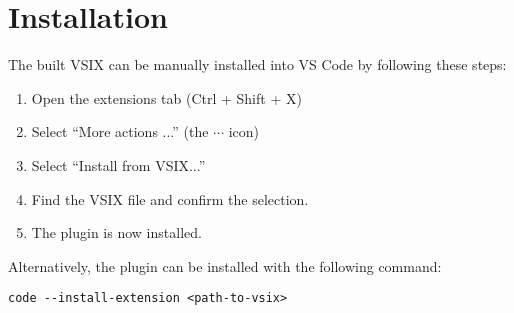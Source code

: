 \section{Installation}
The built VSIX can be manually installed into VS Code by following these steps:
\begin{enumerate}
	\item Open the extensions tab (Ctrl + Shift + X)
	\item Select ``More actions ...'' (the $\cdots$ icon)
	\item Select ``Install from VSIX...''
	\item Find the VSIX file and confirm the selection.
	\item The plugin is now installed.
\end{enumerate}

Alternatively, the plugin can be installed with the following command:
\begin{verbatim}
code --install-extension <path-to-vsix>
\end{verbatim}
